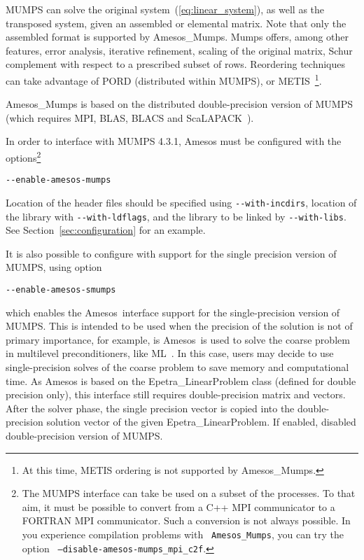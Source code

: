 \documentclass[11pt]{SANDreport}
\newcommand{\amesos}{{\sc Amesos}}
\newcommand{\ml}{{\sc ML}}
\begin{document}
MUMPS can solve the original system~(\ref{eq:linear_system}), as well as
the transposed system, given an assembled or elemental matrix. Note that
only the assembled format is supported by Amesos\_Mumps. Mumps offers,
among other features, error analysis, iterative refinement, scaling of
the original matrix, Schur complement with respect to a prescribed
subset of rows. Reordering techniques can take advantage of PORD
(distributed within MUMPS), or METIS~\cite{METIS}\footnote{At this time,
  METIS ordering is not supported by Amesos\_Mumps.}. 

Amesos\_Mumps is based on the distributed double-precision version of
MUMPS (which requires MPI, BLAS, BLACS
and ScaLAPACK~\cite{scalapack}).  

\medskip

In order to interface with MUMPS 4.3.1, Amesos must be configured with
the options\footnote{The MUMPS interface can take be used on a subset of
  the processes. To that aim, it must be possible to convert from a C++
  MPI communicator to a FORTRAN MPI communicator. Such a conversion is
  not always possible. In you experience compilation problems with {\tt
    Amesos\_Mumps}, you can try the option {\tt
    --disable-amesos-mumps\_mpi\_c2f}.}
\begin{verbatim}
--enable-amesos-mumps 
\end{verbatim}
Location of the header files should be specified using \verb!--with-incdirs!,
location of the library with \verb!--with-ldflags!, and the library
to be linked by \verb!--with-libs!. See Section~\ref{sec:configuration} for an
example.

It is also possible to configure with support for the single precision
version of MUMPS, using option
\begin{verbatim}
--enable-amesos-smumps 
\end{verbatim}
which enables the \amesos\ interface support for the
single-precision version of MUMPS. This is intended to be used when
the precision of the solution is not of primary importance, for example,
is \amesos\ is used to solve the coarse problem in multilevel
preconditioners, like \ml~\cite{ml-guide}. In this case, users may decide
to use single-precision solves of the coarse problem
to save memory and computational time. As
Amesos is based on the Epetra\_LinearProblem class
(defined for double precision only), this interface
still requires double-precision matrix and vectors.
After the solver phase, the single precision vector
is copied into the double-precision solution vector
of the given Epetra\_LinearProblem. If enabled,
disabled double-precision version of MUMPS.
\end{document}
